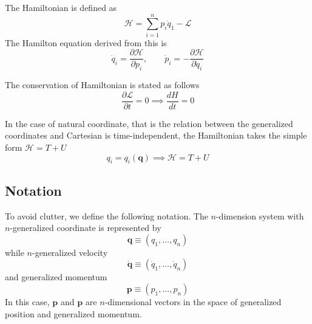 \documentclass[../../../main.tex]{subfiles}
\begin{document}
The Hamiltonian is defined as
\begin{equation*}
	\mathcal{H}=\sum_{i=1}^{n}p_i\dot{q}_1-\mathcal{L}
\end{equation*}
The Hamilton equation derived from this is
\begin{equation*}
	\dot{q}_i=\frac{\partial\mathcal{H}}{\partial p_i},\qquad\dot{p}_i=-\frac{\partial\mathcal{H}}{\partial \dot{q}_i}
\end{equation*}

The conservation of Hamiltonian is stated as follows
\begin{equation*}
	\frac{\partial\mathcal{L}}{\partial t}=0\implies\frac{dH}{dt}=0
\end{equation*}

In the case of natural coordinate, that is the relation between the generalized coordinates and Cartesian is time-independent, the Hamiltonian takes the simple form $\mathcal{H}=T+U$
\begin{equation*}
	q_i=q_i(\mathbf{q})\implies\mathcal{H}=T+U
\end{equation*}

\subsection*{Notation}
To avoid clutter, we define the following notation.
The $n$-dimension system with $n$-generalized coordinate is represented by
\begin{equation*}
	\mathbf{q}\equiv(q_1,\dots,q_n)
\end{equation*}
while $n$-generalized velocity
\begin{equation*}
	\dot{\mathbf{q}}\equiv(\dot{q}_1,\dots,\dot{q}_n)
\end{equation*}
and generalized momentum
\begin{equation*}
	\mathbf{p}\equiv(p_1,\dots,p_n)
\end{equation*}
In this case, $\mathbf{p}$ and $\mathbf{p}$ are $n$-dimensional vectors in the space of generalized position and generalized momentum.
\end{document}
